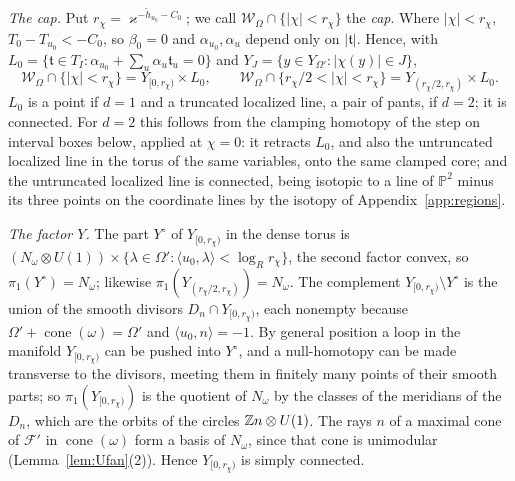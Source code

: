 \emph{The cap.} Put $r_\chi=\varkappa^{-\check h_{u_0}-C_0}$; we call $\mathscr W_\Omega\cap\{|\chi|<r_\chi\}$ the \emph{cap}. Where $|\chi|<r_\chi$, $T_0-T_{u_0}<-C_0$, so $\beta_0=0$ and $\alpha_{u_0},\alpha_u$ depend only on $|\mathfrak t|$. Hence, with $L_0=\{\mathfrak t\in T_I:\alpha_{u_0}+\sum_u\alpha_u\mathfrak t_u=0\}$ and $Y_J=\{y\in Y_{\Omega'}:|\chi(y)|\in J\}$,
\[
\mathscr W_\Omega\cap\{|\chi|<r_\chi\}=Y_{[0,r_\chi)}\times L_0,\qquad \mathscr W_\Omega\cap\{r_\chi/2<|\chi|<r_\chi\}=Y_{(r_\chi/2,r_\chi)}\times L_0 .
\]
$L_0$ is a point if $d=1$ and a truncated localized line, a pair of pants, if $d=2$; it is connected. For $d=2$ this
follows from the clamping homotopy of the step on interval boxes below, applied at $\chi=0$: it retracts $L_0$, and also the untruncated
localized line in the torus of the same variables, onto the same clamped core; and the untruncated localized line is
connected, being isotopic to a line of $\mathbb P^2$ minus its three points on the coordinate lines by the isotopy of
Appendix~\ref{app:regions}.

\emph{The factor $Y$.} The part $Y^\circ$ of $Y_{[0,r_\chi)}$ in the dense torus is $(N_\omega\otimes U(1))\times\{\lambda\in \Omega':\langle u_0,\lambda\rangle<\log_Rr_\chi\}$, the second factor convex, so $\pi_1(Y^\circ)=N_\omega$; likewise $\pi_1(Y_{(r_\chi/2,r_\chi)})=N_\omega$. The complement $Y_{[0,r_\chi)}\setminus Y^\circ$ is the union of the smooth divisors $D_n\cap Y_{[0,r_\chi)}$, each nonempty because $\Omega'+\operatorname{cone}(\omega)=\Omega'$ and $\langle u_0,n\rangle=-1$. By general position a loop in the manifold $Y_{[0,r_\chi)}$ can be pushed into $Y^\circ$, and a null-homotopy can be made transverse to the divisors, meeting them in finitely many points of their smooth parts; so $\pi_1(Y_{[0,r_\chi)})$ is the quotient of $N_\omega$ by the classes of the meridians of the $D_n$, which are the orbits of the circles $\mathbb Z n\otimes U(1)$. The rays $n$ of a maximal cone of $\mathcal F'$ in $\operatorname{cone}(\omega)$ form a basis of $N_\omega$, since that cone is unimodular (Lemma~\ref{lem:Ufan}(2)). Hence $Y_{[0,r_\chi)}$ is simply connected.

